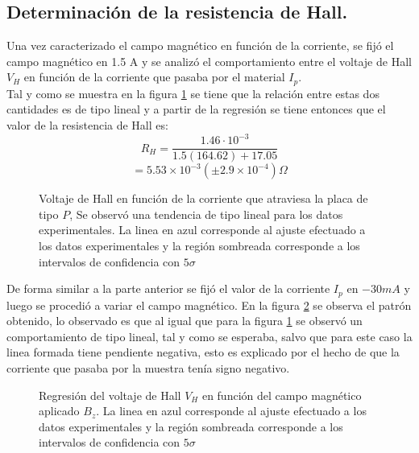 \documentclass[%
 reprint,
 amsmath,amssymb,
 aps,
]{revtex4-1}
\begin{document}
\subsection{Determinación de la resistencia de Hall.}
Una vez caracterizado el campo magnético en función de la corriente, se fijó el campo magnético en 1.5 A y se analizó el comportamiento entre el voltaje de Hall $V_H$ en función de la corriente que pasaba por el material $I_p$.\\
Tal y como se muestra en la figura \ref{V_H_vs_I_p} se tiene que la relación entre estas dos cantidades es de tipo lineal y a partir de la regresión se tiene entonces que el valor de la resistencia de Hall es:
\[R_H=\frac{1.46\cdot 10^{-3}}{1.5(164.62)+17.05}\]
\[=5.53\times 10^{-3} (\pm 2.9\times 10^{-4}) \Omega\]
\begin{figure}[h!]
\caption{\label{V_H_vs_I_p}Voltaje de Hall en función de la corriente que atraviesa la placa de tipo $P$, Se observó una tendencia de tipo lineal para los datos experimentales. La linea en azul corresponde al ajuste efectuado a los datos experimentales y la región sombreada corresponde a los intervalos de confidencia con $5\sigma$}
\end{figure}

 De forma similar a la parte anterior se fijó el valor de la corriente $I_p$ en $-30 mA$ y luego se procedió a variar el campo magnético. En la figura \ref{V_H_vs_campo}  se observa el patrón obtenido, lo observado es que al igual que para la figura \ref{V_H_vs_I_p} se observó un comportamiento de tipo lineal, tal y como se esperaba, salvo que para este caso la linea formada tiene pendiente negativa, esto es explicado por el hecho de que la corriente que pasaba por la muestra tenía signo negativo.
\begin{figure}[h!]
\caption{\label{V_H_vs_campo}Regresión del voltaje de Hall $V_H$ en función del campo magnético aplicado $B_z$.  La linea en azul corresponde al ajuste efectuado a los datos experimentales y la región sombreada corresponde a los intervalos de confidencia con $5\sigma$}
\end{figure}
\end{document}
